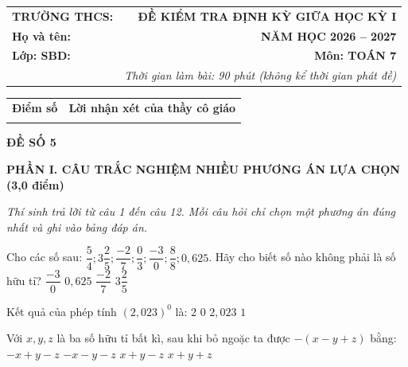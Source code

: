 \documentclass[12pt,a4paper]{article}
\begin{document}
\noindent
\begin{tabularx}{\linewidth}{X r}
\textbf{TRƯỜNG THCS: \dotfill} & \textbf{ĐỀ KIỂM TRA ĐỊNH KỲ GIỮA HỌC KỲ I} \\
\textbf{Họ và tên: \dotfill} & \textbf{NĂM HỌC 2026 -- 2027} \\
\textbf{Lớp: \dotfill \quad SBD: \dotfill} & \textbf{Môn: TOÁN 7} \\
& \textit{Thời gian làm bài: 90 phút (không kể thời gian phát đề)}
\end{tabularx}

\vspace{1.5mm}
\noindent
\begin{tabularx}{\linewidth}{|p{3.5cm}|X|}
\hline
\centering\textbf{Điểm số} & \centering\textbf{Lời nhận xét của thầy cô giáo} \tabularnewline
\rule{0pt}{1.6cm} & \\
\hline
\end{tabularx}

\vspace{2.5mm}
\begin{center}
\textbf{\large ĐỀ SỐ 5}
\end{center}

\noindent\textbf{\large PHẦN I. CÂU TRẮC NGHIỆM NHIỀU PHƯƠNG ÁN LỰA CHỌN (3,0 điểm)}

\textit{Thí sinh trả lời từ câu 1 đến câu 12. Mỗi câu hỏi chỉ chọn một phương án đúng nhất và ghi vào bảng đáp án.}

\vspace{1mm}
\begin{ex}
Cho các số sau: $\dfrac{5}{4}; 3\dfrac{2}{5}; \dfrac{-2}{7}; \dfrac{0}{3}; \dfrac{-3}{0}; \dfrac{8}{8}; 0{,}625$. Hãy cho biết số nào không phải là số hữu tỉ?
\choice
{\True $\dfrac{-3}{0}$}
{$0{,}625$}
{$\dfrac{-2}{7}$}
{$3\dfrac{2}{5}$}
\end{ex}

\begin{ex}
Kết quả của phép tính $(2{,}023)^0$ là:
\choice
{$2$}
{$0$}
{$2{,}023$}
{\True $1$}
\end{ex}

\begin{ex}
Với $x, y, z$ là ba số hữu tỉ bất kì, sau khi bỏ ngoặc ta được $-(x - y + z)$ bằng:
\choice
{\True $-x + y - z$}
{$-x - y - z$}
{$x + y - z$}
{$x + y + z$}
\end{ex}
\end{document}
